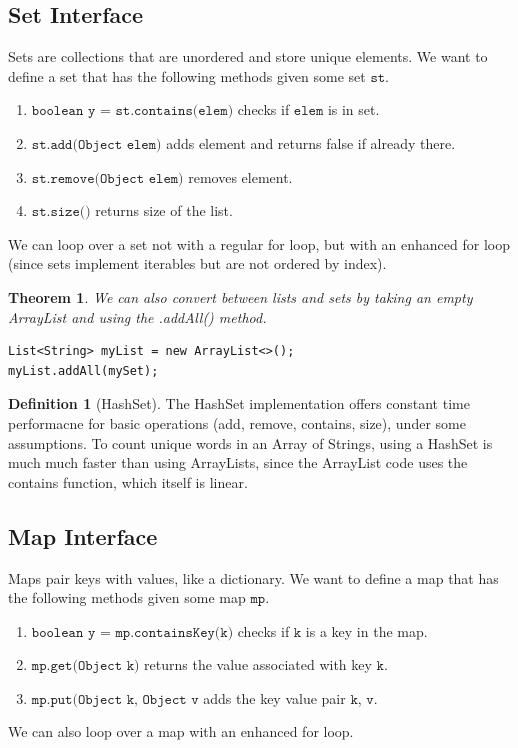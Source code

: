 \documentclass{article}
\newtheorem{theorem}{Theorem}[section]
\theoremstyle{definition}
\theoremstyle{remark}
\theoremstyle{definition}
\newtheorem{definition}{Definition}[section]
\begin{document}
\subsection{Set Interface}

Sets are collections that are unordered and store unique elements. We want to define a set that has the following methods given some set $\texttt{st}$. 
\begin{enumerate}
    \item $\texttt{boolean y = st.contains(elem)}$ checks if $\texttt{elem}$ is in set. 
    \item $\texttt{st.add(Object elem)}$ adds element and returns false if already there. 
    \item $\texttt{st.remove(Object elem)}$ removes element. 
    \item $\texttt{st.size()}$ returns size of the list. 
\end{enumerate}
We can loop over a set not with a regular for loop, but with an enhanced for loop (since sets implement iterables but are not ordered by index). 

\begin{theorem}
We can also convert between lists and sets by taking an empty ArrayList and using the .addAll() method.
\begin{verbatim}
List<String> myList = new ArrayList<>(); 
myList.addAll(mySet); 
\end{verbatim}
\end{theorem}

\begin{definition}[HashSet]
The HashSet implementation offers constant time performacne for basic operations (add, remove, contains, size), under some assumptions. To count unique words in an Array of Strings, using a HashSet is much much faster than using ArrayLists, since the ArrayList code uses the contains function, which itself is linear. 
\end{definition}

\subsection{Map Interface}

Maps pair keys with values, like a dictionary. We want to define a map that has the following methods given some map $\texttt{mp}$. 
\begin{enumerate}
    \item $\texttt{boolean y = mp.containsKey(k)}$ checks if $\texttt{k}$ is a key in the map. 
    \item $\texttt{mp.get(Object k)}$ returns the value associated with key $\texttt{k}$. 
    \item $\texttt{mp.put(Object k, Object v}$ adds the key value pair $\texttt{k}$, $\texttt{v}$. 
\end{enumerate}
We can also loop over a map with an enhanced for loop. 
\end{document}
